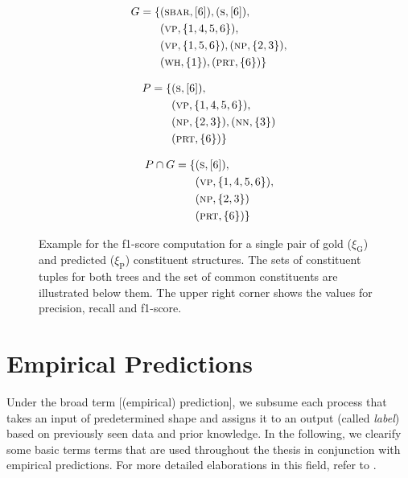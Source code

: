 \documentclass[../document.tex]{subfiles}
\begin{document}
\begin{figure}
        \begin{minipage}{.35\linewidth}
            \small
            \begin{align*}
                G = \{
                &(\textsc{sbar}, [6]),
                (\textsc{s}, [6]), \\
                &(\textsc{vp}, \{1,4,5,6\}),\\
                &(\textsc{vp}, \{1,5,6\}),
                (\textsc{np}, \{2,3\}), \\
                &(\textsc{wh}, \{1\}),
                (\textsc{prt}, \{6\}) \}
            \end{align*}
        \end{minipage}
        \hfill
        \begin{minipage}{.3\linewidth}
            \small
            \begin{align*}
                P = \{
                &(\textsc{s}, [6]), \\
                &(\textsc{vp}, \{1,4,5,6\}),\\
                &(\textsc{np}, \{2,3\}),
                (\textsc{nn}, \{3\}) \\
                &(\textsc{prt}, \{6\}) \}
            \end{align*}
        \end{minipage}
        \hfill
        \begin{minipage}{.3\linewidth}
            \small
            \begin{align*}
                P \cap G = \{
                &(\textsc{s}, [6]), \\
                &(\textsc{vp}, \{1,4,5,6\}),\\
                &(\textsc{np}, \{2,3\}) \\
                &(\textsc{prt}, \{6\}) \}
            \end{align*}
        \end{minipage}

        \caption{
            Example for the f1-score computation for a single pair of gold (\(\xi_\text{G}\)) and predicted (\(\xi_\text{P}\)) constituent structures.
            The sets of constituent tuples for both trees and the set of common constituents are illustrated below them.
            The upper right corner shows the values for precision, recall and f1-score.
        }
    \end{figure}

    \section{Empirical Predictions}
    Under the broad term [(empirical) prediction], we subsume each process that takes an input of predetermined shape and assigns it to an output (called \emph{label}) based on previously seen data and prior knowledge.
    In the following, we clearify some basic terms terms that are used throughout the thesis in conjunction with empirical predictions.
    For more detailed elaborations in this field, refer to .
\end{document}
